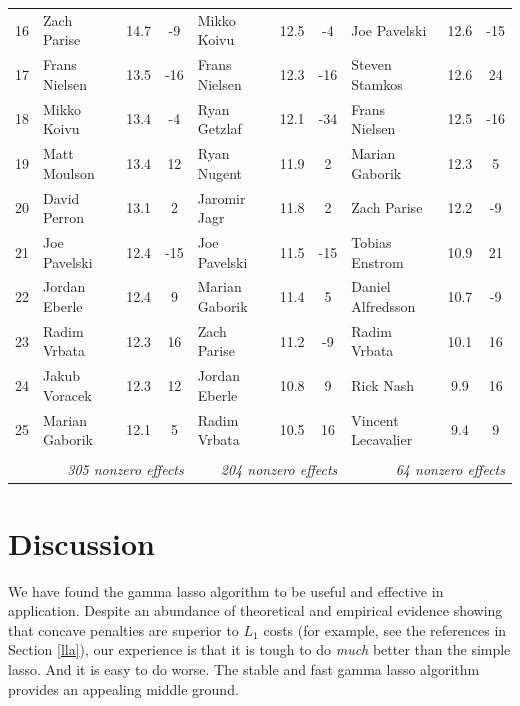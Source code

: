 \documentclass[12pt]{article}
\begin{document}
\begin{table}
{\begin{tabular}{l|lcc|lcc|lcc|}
16 & Zach Parise & 14.7 & -9 & Mikko Koivu & 12.5 & -4 & Joe Pavelski & 12.6 & -15 \\
17 & Frans Nielsen & 13.5 & -16 & Frans Nielsen & 12.3 & -16 & Steven Stamkos & 12.6 & 24 \\
18 & Mikko Koivu & 13.4 & -4 & Ryan Getzlaf & 12.1 & -34 & Frans Nielsen & 12.5 & -16 \\
19 & Matt Moulson & 13.4 & 12 & Ryan Nugent & 11.9 & 2 & Marian Gaborik & 12.3 & 5 \\
20 & David Perron & 13.1 & 2 & Jaromir Jagr & 11.8 & 2 & Zach Parise & 12.2 & -9 \\
21 & Joe Pavelski & 12.4 & -15 & Joe Pavelski & 11.5 & -15 & Tobias Enstrom & 10.9 & 21 \\
22 & Jordan Eberle & 12.4 & 9 & Marian Gaborik & 11.4 & 5 & Daniel Alfredsson & 10.7 & -9 \\
23 & Radim Vrbata & 12.3 & 16 & Zach Parise & 11.2 & -9 & Radim Vrbata & 10.1 & 16 \\
24 & Jakub Voracek & 12.3 & 12 & Jordan Eberle & 10.8 & 9 & Rick Nash & 9.9 & 16 \\
25 & Marian Gaborik & 12.1 & 5 & Radim Vrbata & 10.5 & 16 & Vincent Lecavalier & 9.4 & 9 \\
\multicolumn{1}{c}{} & \multicolumn{3}{r|}{} & \multicolumn{3}{r|}{} &  \multicolumn{3}{r|}{}\\
 \multicolumn{1}{c}{} & \multicolumn{3}{r|}{\it 305 nonzero effects} & \multicolumn{3}{r|}{\it 204 nonzero effects} &  \multicolumn{3}{r|}{\it 64 nonzero effects}
\end{tabular}}
\end{table}


\section{Discussion}
\label{discussion}

 We have found the gamma lasso
algorithm to be  useful and effective in application.  
Despite an abundance of theoretical and  empirical evidence showing that
concave penalties are superior to $L_1$ costs (for example,
see the references in Section \ref{lla}), our experience is that it is tough to do
{\it much} better than the simple lasso.  And it is easy to do worse.  The stable and fast gamma lasso algorithm provides an appealing middle
ground.
\end{document}
